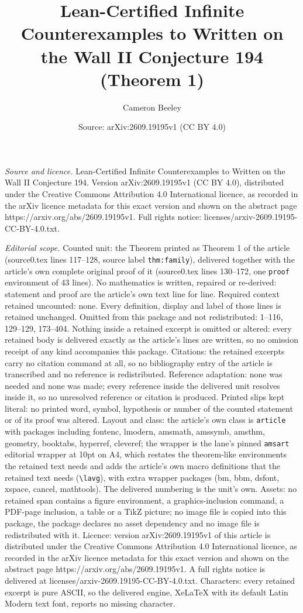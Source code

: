 \documentclass[10pt,a4paper]{amsart}
\title[Lean-Certified Infinite Counterexamples to Written on the Wa]{Lean-Certified Infinite Counterexamples to Written on the Wall II Conjecture 194 (Theorem 1)}
\author{Cameron Beeley}
\date{Source: arXiv:2609.19195v1 (CC BY 4.0)}
\begin{document}
\maketitle

\noindent\emph{Source and licence.} Lean-Certified Infinite Counterexamples to Written on the Wall II Conjecture 194. Version arXiv:2609.19195v1 (CC BY 4.0), distributed under the Creative Commons Attribution 4.0 International licence, as recorded in the arXiv licence metadata for this exact version and shown on the abstract page https://arxiv.org/abs/2609.19195v1. Full rights notice: licenses/arxiv-2609.19195-CC-BY-4.0.txt.\par\smallskip

\noindent\textit{Editorial scope.} Counted unit: the Theorem printed as Theorem 1 of the article (source0.tex lines 117--128, source label \texttt{thm:family}), delivered together with the article's own complete original proof of it (source0.tex lines 130--172, one \texttt{proof} environment of 43 lines). No mathematics is written, repaired or re-derived: statement and proof are the article's own text line for line. Required context retained uncounted: none. Every definition, display and label of those lines is retained unchanged. Omitted from this package and not redistributed: 1--116, 129--129, 173--404. Nothing inside a retained excerpt is omitted or altered: every retained body is delivered exactly as the article's lines are written, so no omission receipt of any kind accompanies this package. Citations: the retained excerpts carry no citation command at all, so no bibliography entry of the article is transcribed and no reference is redistributed. Reference adaptation: none was needed and none was made; every reference inside the delivered unit resolves inside it, so no unresolved reference or citation is produced. Printed slips kept literal: no printed word, symbol, hypothesis or number of the counted statement or of its proof was altered. Layout and class: the article's own class is \texttt{article} with packages including fontenc, lmodern, amsmath, amssymb, amsthm, geometry, booktabs, hyperref, cleveref; the wrapper is the lane's pinned \texttt{amsart} editorial wrapper at 10pt on A4, which restates the theorem-like environments the retained text needs and adds the article's own macro definitions that the retained text needs (\texttt{\textbackslash lavg}), with extra wrapper packages (bm, bbm, dsfont, xspace, cancel, mathtools). The delivered numbering is the unit's own. Assets: no retained span contains a figure environment, a graphics-inclusion command, a PDF-page inclusion, a table or a TikZ picture; no image file is copied into this package, the package declares no asset dependency and no image file is redistributed with it. Licence: version arXiv:2609.19195v1 of this article is distributed under the Creative Commons Attribution 4.0 International licence, as recorded in the arXiv licence metadata for this exact version and shown on the abstract page https://arxiv.org/abs/2609.19195v1. A full rights notice is delivered at licenses/arxiv-2609.19195-CC-BY-4.0.txt. Characters: every retained excerpt is pure ASCII, so the delivered engine, XeLaTeX with its default Latin Modern text font, reports no missing character.
\end{document}
